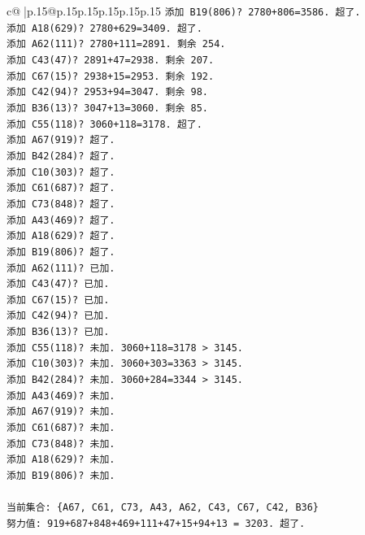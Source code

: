 \documentclass{article}
\begin{document}
{\begin{supertabular}{c@{$\;$}|p{.15\linewidth}@{}p{.15\linewidth}p{.15\linewidth}p{.15\linewidth}p{.15\linewidth}p{.15\linewidth}}
{{{\texttt{添加 B19(806)? 2780+806=3586. 超了.} \\
\texttt{添加 A18(629)? 2780+629=3409. 超了.} \\
\texttt{添加 A62(111)? 2780+111=2891. 剩余 254.} \\
\texttt{添加 C43(47)? 2891+47=2938. 剩余 207.} \\
\texttt{添加 C67(15)? 2938+15=2953. 剩余 192.} \\
\texttt{添加 C42(94)? 2953+94=3047. 剩余 98.} \\
\texttt{添加 B36(13)? 3047+13=3060. 剩余 85.} \\
\texttt{添加 C55(118)? 3060+118=3178. 超了.} \\
\texttt{添加 A67(919)? 超了.} \\
\texttt{添加 B42(284)? 超了.} \\
\texttt{添加 C10(303)? 超了.} \\
\texttt{添加 C61(687)? 超了.} \\
\texttt{添加 C73(848)? 超了.} \\
\texttt{添加 A43(469)? 超了.} \\
\texttt{添加 A18(629)? 超了.} \\
\texttt{添加 B19(806)? 超了.} \\
\texttt{添加 A62(111)? 已加.} \\
\texttt{添加 C43(47)? 已加.} \\
\texttt{添加 C67(15)? 已加.} \\
\texttt{添加 C42(94)? 已加.} \\
\texttt{添加 B36(13)? 已加.} \\
\texttt{添加 C55(118)? 未加. 3060+118=3178 > 3145.} \\
\texttt{添加 C10(303)? 未加. 3060+303=3363 > 3145.} \\
\texttt{添加 B42(284)? 未加. 3060+284=3344 > 3145.} \\
\texttt{添加 A43(469)? 未加.} \\
\texttt{添加 A67(919)? 未加.} \\
\texttt{添加 C61(687)? 未加.} \\
\texttt{添加 C73(848)? 未加.} \\
\texttt{添加 A18(629)? 未加.} \\
\texttt{添加 B19(806)? 未加.} \\
\\ 
\texttt{当前集合: \{A67, C61, C73, A43, A62, C43, C67, C42, B36\}} \\
\texttt{努力值: 919+687+848+469+111+47+15+94+13 = 3203. 超了.} \\
}}}
\end{supertabular}}
\end{document}

